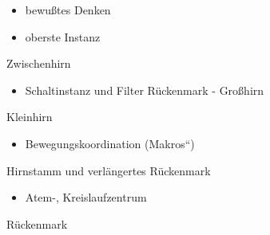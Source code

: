 \documentclass{article}
\begin{document}
\begin{itemize}
\item bewu{\ss}tes Denken

\item oberste Instanz

\end{itemize}
Zwischenhirn

\begin{itemize}
\item Schaltinstanz und Filter R\"uckenmark - Gro{\ss}hirn

\end{itemize}
Kleinhirn

\begin{itemize}
\item Bewegungskoordination ({\quotedblbase}Makros{\textquotedblleft})

\end{itemize}
Hirnstamm und verl\"angertes R\"uckenmark

\begin{itemize}
\item Atem-, Kreislaufzentrum

\end{itemize}
R\"uckenmark
\end{document}
